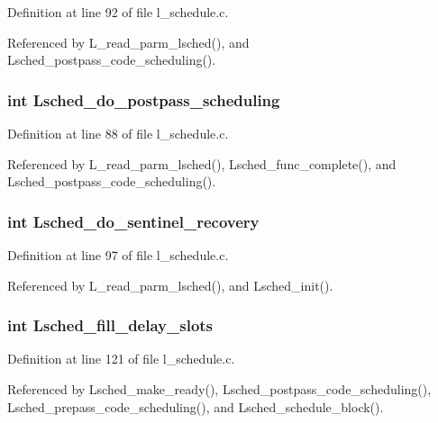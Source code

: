 Definition at line 92 of file l\_\-schedule.c.

Referenced by L\_\-read\_\-parm\_\-lsched(), and Lsched\_\-postpass\_\-code\_\-scheduling().
\subsubsection{\setlength{\rightskip}{0pt plus 5cm}int \bf{Lsched\_\-do\_\-postpass\_\-scheduling}}\label{l__schedule_8h_0feea7b69688d91321677afa857b2e9b}




Definition at line 88 of file l\_\-schedule.c.

Referenced by L\_\-read\_\-parm\_\-lsched(), Lsched\_\-func\_\-complete(), and Lsched\_\-postpass\_\-code\_\-scheduling().
\subsubsection{\setlength{\rightskip}{0pt plus 5cm}int \bf{Lsched\_\-do\_\-sentinel\_\-recovery}}\label{l__schedule_8h_e92a2b503333948c586d0b6907833c94}




Definition at line 97 of file l\_\-schedule.c.

Referenced by L\_\-read\_\-parm\_\-lsched(), and Lsched\_\-init().
\subsubsection{\setlength{\rightskip}{0pt plus 5cm}int \bf{Lsched\_\-fill\_\-delay\_\-slots}}\label{l__schedule_8h_6d53c903b4fd077ed1a02626dbebfda0}




Definition at line 121 of file l\_\-schedule.c.

Referenced by Lsched\_\-make\_\-ready(), Lsched\_\-postpass\_\-code\_\-scheduling(), Lsched\_\-prepass\_\-code\_\-scheduling(), and Lsched\_\-schedule\_\-block().
